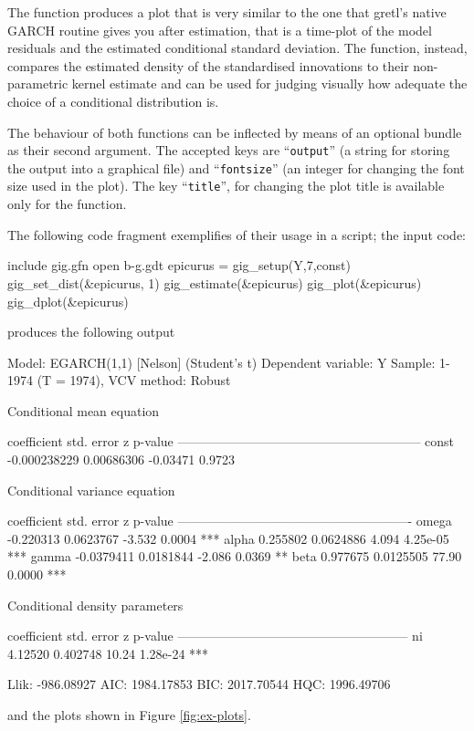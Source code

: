 \documentclass[a4paper,11pt]{article}
\newcommand{\dtk}[1]{\texttt{\detokenize{#1}}}
\newcommand{\app}[1]{\textsf{#1}}
\newcounter{script}[section]
\begin{document}
The \dtk{gig_plot} function produces a plot that is very similar to
the one that \app{gretl}'s native GARCH routine gives you after
estimation, that is a time-plot of the model residuals and the
estimated conditional standard deviation. The \dtk{gig_dplot}
function, instead, compares the estimated density of the standardised
innovations to their non-parametric kernel estimate and can be used
for judging visually how adequate the choice of a conditional
distribution is.

The behaviour of both functions can be inflected by means of an
optional bundle as their second argument. The accepted keys are
``\texttt{output}'' (a string for storing the output into a graphical
file) and ``\texttt{fontsize}'' (an integer for changing the font size
used in the plot). The key ``\texttt{title}'', for changing the plot
title is available only for the \dtk{gig_plot} function. 

The following code
fragment exemplifies of their usage in a script; the input code:

\begin{code}
include gig.gfn
open b-g.gdt
epicurus = gig_setup(Y,7,const)
gig_set_dist(&epicurus, 1)
gig_estimate(&epicurus)
gig_plot(&epicurus)
gig_dplot(&epicurus)
\end{code}
produces the following output
\begin{small}
\begin{code}
Model: EGARCH(1,1) [Nelson] (Student's t)
Dependent variable: Y
Sample: 1-1974 (T = 1974), VCV method: Robust

    Conditional mean equation

             coefficient    std. error      z       p-value
  ---------------------------------------------------------
  const      -0.000238229   0.00686306   -0.03471   0.9723

    Conditional variance equation

             coefficient   std. error     z      p-value
  -------------------------------------------------------
  omega      -0.220313     0.0623767    -3.532   0.0004   ***
  alpha       0.255802     0.0624886     4.094   4.25e-05 ***
  gamma      -0.0379411    0.0181844    -2.086   0.0369   **
  beta        0.977675     0.0125505    77.90    0.0000   ***

    Conditional density parameters

             coefficient   std. error     z     p-value
  ------------------------------------------------------
  ni           4.12520      0.402748    10.24   1.28e-24 ***

	Llik:   -986.08927	 AIC:   1984.17853
	BIC:    2017.70544	 HQC:   1996.49706
\end{code}
\end{small}
and the plots shown in Figure \ref{fig:ex-plots}.
\end{document}
